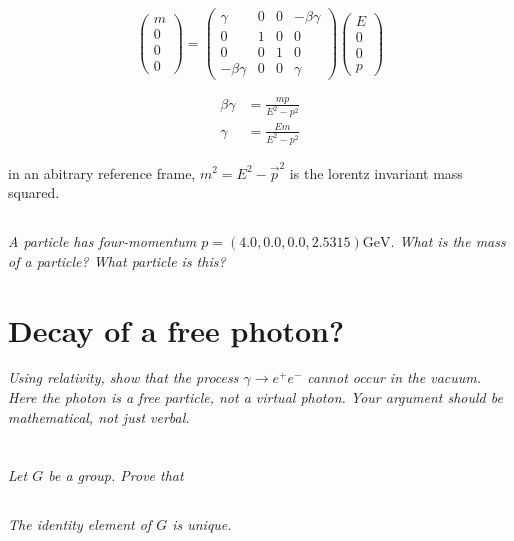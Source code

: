 \documentclass{article}
\begin{document}
\begin{equation}
\left(\begin{array}{l}
m \\
0 \\
0 \\
0
\end{array}\right)=\left(\begin{array}{llll}
\gamma & 0 & 0 & -\beta \gamma \\
0 & 1 & 0 & 0 \\
0 & 0 & 1 & 0 \\
-\beta \gamma & 0 & 0 & \gamma
\end{array}\right)\left(\begin{array}{l}
E \\
0 \\
0 \\
p
\end{array}\right)
\end{equation}

\begin{align*}
\beta \gamma&=\frac{m p}{E^{2}-p^{2}} \\
\gamma&=\frac{E m}{E^{2}-p^{2}}
\end{align*}

in an abitrary reference frame, $m^{2}=E^{2}-\vec{p}^{2}$ is the lorentz invariant  mass squared.

\subsection{}
\textit{A particle has four-momentum $p=(4.0,0.0,0.0,2.5315) \mathrm{GeV} .$ What is the mass of a particle? What particle is this?}

\newpage


\section{Decay of a free photon?}
\textit{Using relativity, show that the process $\gamma \rightarrow e^{+} e^{-}$ cannot occur in the vacuum. Here the photon is a free particle, not a virtual photon. Your argument should be mathematical, not just verbal.}

\newpage


\section{}
\textit{Let $G$ be a group. Prove that}

\subsection{}
\textit{The identity element of $G$ is unique.}
\end{document}
